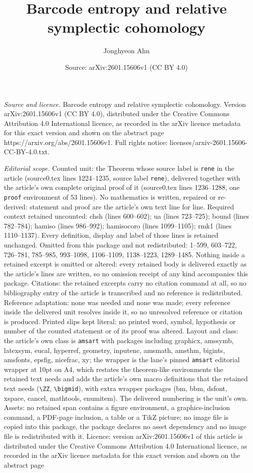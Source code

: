 \documentclass[10pt,a4paper]{amsart}
\title[Barcode entropy and relative symplectic cohomology]{Barcode entropy and relative symplectic cohomology}
\author{Jonghyeon Ahn}
\date{Source: arXiv:2601.15606v1 (CC BY 4.0)}
\begin{document}
\maketitle

\noindent\emph{Source and licence.} Barcode entropy and relative symplectic cohomology. Version arXiv:2601.15606v1 (CC BY 4.0), distributed under the Creative Commons Attribution 4.0 International licence, as recorded in the arXiv licence metadata for this exact version and shown on the abstract page https://arxiv.org/abs/2601.15606v1. Full rights notice: licenses/arxiv-2601.15606-CC-BY-4.0.txt.\par\smallskip

\noindent\textit{Editorial scope.} Counted unit: the Theorem whose source label is \texttt{rene} in the article (source0.tex lines 1224--1235, source label \texttt{rene}), delivered together with the article's own complete original proof of it (source0.tex lines 1236--1288, one \texttt{proof} environment of 53 lines). No mathematics is written, repaired or re-derived: statement and proof are the article's own text line for line. Required context retained uncounted: chsh (lines 600--602); ua (lines 723--725); bound (lines 782--784); hamiso (lines 986--992); hamisocoro (lines 1099--1105); rmk1 (lines 1110--1137). Every definition, display and label of those lines is retained unchanged. Omitted from this package and not redistributed: 1--599, 603--722, 726--781, 785--985, 993--1098, 1106--1109, 1138--1223, 1289--1485. Nothing inside a retained excerpt is omitted or altered: every retained body is delivered exactly as the article's lines are written, so no omission receipt of any kind accompanies this package. Citations: the retained excerpts carry no citation command at all, so no bibliography entry of the article is transcribed and no reference is redistributed. Reference adaptation: none was needed and none was made; every reference inside the delivered unit resolves inside it, so no unresolved reference or citation is produced. Printed slips kept literal: no printed word, symbol, hypothesis or number of the counted statement or of its proof was altered. Layout and class: the article's own class is \texttt{amsart} with packages including graphicx, amssymb, latexsym, eucal, hyperref, geometry, inputenc, amsmath, amsthm, bigints, amsfonts, epsfig, nicefrac, xy; the wrapper is the lane's pinned \texttt{amsart} editorial wrapper at 10pt on A4, which restates the theorem-like environments the retained text needs and adds the article's own macro definitions that the retained text needs (\texttt{\textbackslash ZZ}, \texttt{\textbackslash bigmid}), with extra wrapper packages (bm, bbm, dsfont, xspace, cancel, mathtools, enumitem). The delivered numbering is the unit's own. Assets: no retained span contains a figure environment, a graphics-inclusion command, a PDF-page inclusion, a table or a TikZ picture; no image file is copied into this package, the package declares no asset dependency and no image file is redistributed with it. Licence: version arXiv:2601.15606v1 of this article is distributed under the Creative Commons Attribution 4.0 International licence, as recorded in the arXiv licence metadata for this exact version and shown on the abstract page 
\end{document}
